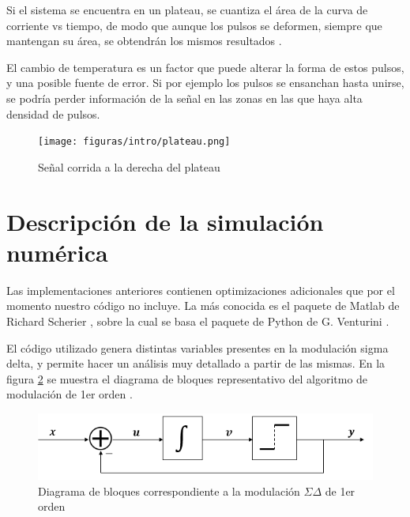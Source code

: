 \documentclass[twoside]{article}
\begin{document}
\begin{multicols}{2}
Si el sistema se encuentra en un plateau, se cuantiza el área de la curva de corriente vs tiempo, de modo que aunque los pulsos se deformen, siempre que mantengan su área, se obtendrán los mismos resultados \cite{benz1998}.

El cambio de temperatura es un factor que puede alterar la forma de estos pulsos, y una posible fuente de error. Si por ejemplo los pulsos se ensanchan hasta unirse, se podría perder información de la señal en las zonas en las que haya alta densidad de pulsos.



\begin{figure}[H]
    \centering
    \texttt{[image: figuras/intro/plateau.png]}
    \caption{Señal corrida a la derecha del plateau}
    \label{fig:intro_plateau}
\end{figure}

\section{Descripción de la simulación numérica}



Las implementaciones anteriores contienen optimizaciones adicionales que por el momento nuestro código no incluye. La más conocida es el paquete de Matlab de Richard Scherier \cite{DSmatlab}, sobre la cual se basa el paquete de Python de G. Venturini \cite{DSpython}.

El código utilizado genera distintas variables presentes en la modulación sigma delta, y permite hacer un análisis muy detallado a partir de las mismas. En la figura \ref{fig:bloques} se muestra el diagrama de bloques representativo del algoritmo de modulación de 1er orden \cite{script}.

\begin{figure}[H]
\centering
\includegraphics[width=\linewidth]{figuras/bloques_1erorden.png}
\caption{Diagrama de bloques correspondiente a la modulación $\Sigma\Delta$ de 1er orden}
\label{fig:bloques}
\end{figure}


\end{multicols}
\end{document}
